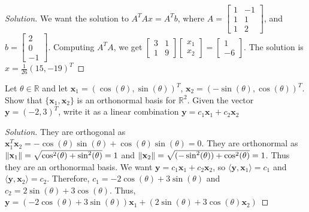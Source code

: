 \documentclass[../main.tex]{subfiles}
\begin{document}
\begin{proof}[Solution]
We want the solution to $A^T A x = A^T b$, where $A = \begin{bmatrix} 1 & -1 \\ 1 & 1 \\ 1 & 2 \end{bmatrix}$, and $b = \begin{bmatrix} 2\\0\\-1\end{bmatrix}$. Computing $A^T A$, we get $\begin{bmatrix} 3 & 1 \\ 1 & 9 \end{bmatrix} \begin{bmatrix} x_1 \\ x_2 \end{bmatrix} = \begin{bmatrix} 1 \\ -6 \end{bmatrix}$. The solution is $x = \frac{1}{26}(15,-19)^T$
\end{proof}
%
\begin{problem}
Let $\theta\in\mathbb{R}$ and let $\mathbf{x}_1 = (\cos(\theta), \sin(\theta))^{T}$, $\mathbf{x}_2 = (-\sin(\theta), \cos(\theta))^{T}$. Show that $\{\mathbf{x}_1,\mathbf{x}_2\}$ is an orthonormal basis for $\mathbb{R}^2$. Given the vector $\mathbf{y} = (-2, 3)^{T}$, write it as a linear combination $\mathbf{y} = c_1 \mathbf{x}_1+c_2\mathbf{x}_2$
\end{problem}
\begin{proof}[Solution]
They are orthogonal as $\mathbf{x}_1^T \mathbf{x}_2 = -\cos(\theta)\sin(\theta) + \cos(\theta)\sin(\theta) = 0$. They are orthonormal as $\norm{\mathbf{x}_1} = \sqrt{\cos^2(\theta)+\sin^2(\theta)} = 1$ and $\norm{\mathbf{x}_2} = \sqrt{(-\sin^2(\theta))+\cos^2(\theta)}=1$. Thus they are an orthonormal basis. We want $\mathbf{y} = c_1 \mathbf{x}_1 + c_2 \mathbf{x}_2$, so $\langle \mathbf{y}, \mathbf{x}_{1}\rangle = c_{1}$ and $\langle \mathbf{y},\mathbf{x}_{2}\rangle = c_{2}$. Therefore, $c_1 = -2\cos(\theta)+3\sin(\theta)$ and $c_2 = 2\sin(\theta)+3\cos(\theta)$. Thus, $\mathbf{y} = (-2\cos(\theta)+3\sin(\theta))\mathbf{x}_1 + (2\sin(\theta)+3\cos(\theta)\mathbf{x}_2)$
\end{proof}
%
\end{document}
